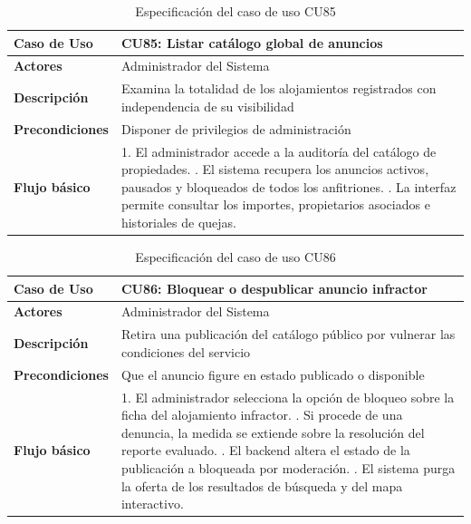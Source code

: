 \begin{table}[H]
\centering
\begin{tabular}{|p{3.2cm}|p{11.3cm}|}
\hline
\textbf{Caso de Uso} & \textbf{CU85: Listar catálogo global de anuncios} \\ \hline
\textbf{Actores} & Administrador del Sistema \\ \hline
\textbf{Descripción} & Examina la totalidad de los alojamientos registrados con independencia de su visibilidad \\ \hline
\textbf{Precondiciones} & Disponer de privilegios de administración \\ \hline
\textbf{Flujo básico} & 
1. El administrador accede a la auditoría del catálogo de propiedades. \newline
2. El sistema recupera los anuncios activos, pausados y bloqueados de todos los anfitriones. \newline
3. La interfaz permite consultar los importes, propietarios asociados e historiales de quejas. \\ \hline
\end{tabular}
\caption{Especificación del caso de uso CU85}
\label{tab:cu85}
\end{table}

\begin{table}[H]
\centering
\begin{tabular}{|p{3.2cm}|p{11.3cm}|}
\hline
\textbf{Caso de Uso} & \textbf{CU86: Bloquear o despublicar anuncio infractor} \\ \hline
\textbf{Actores} & Administrador del Sistema \\ \hline
\textbf{Descripción} & Retira una publicación del catálogo público por vulnerar las condiciones del servicio \\ \hline
\textbf{Precondiciones} & Que el anuncio figure en estado publicado o disponible \\ \hline
\textbf{Flujo básico} & 
1. El administrador selecciona la opción de bloqueo sobre la ficha del alojamiento infractor. \newline
2. Si procede de una denuncia, la medida se extiende sobre la resolución del reporte evaluado. \newline
3. El backend altera el estado de la publicación a bloqueada por moderación. \newline
4. El sistema purga la oferta de los resultados de búsqueda y del mapa interactivo. \\ \hline
\end{tabular}
\caption{Especificación del caso de uso CU86}
\label{tab:cu86}
\end{table}